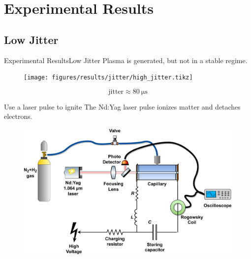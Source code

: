 \documentclass[dvipsnames]{beamer}
\begin{document}
\section{Experimental Results}
\subsection{Low Jitter}
\begin{frame}{Experimental Results}{Low Jitter}
Plasma is generated, but not in a stable regime.
\begin{figure}
 \texttt{[image: figures/results/jitter/high\_jitter.tikz]}
\end{figure}
$$\text{jitter}\approx \SI{80}{\us}$$
\end{frame}
\begin{frame}{Use a laser pulse to ignite}
 The Nd:Yag laser pulse ionizes matter and detaches electrons.
\begin{figure}
 \centering
 \includegraphics[width=\textwidth]{figures/results/jitter/Laser_based_ignition_scheme.pdf}
\end{figure}
\end{frame}
% 
\end{document}
